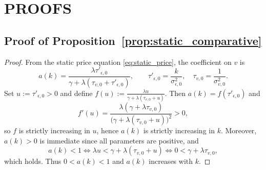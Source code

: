 \section{PROOFS}
\label{sec:proofs}

\subsection*{Proof of Proposition~\ref{prop:static_comparative}}
\begin{proof}
From the static price equation \eqref{eq:static_price}, the coefficient on $v$ is
\[
a(k)=\frac{\lambda \tau'_{\epsilon,0}}{\gamma+\lambda(\tau_{v,0}+\tau'_{\epsilon,0})},
\qquad \tau'_{\epsilon,0}=\frac{k}{\sigma_{\epsilon,0}^2},\quad \tau_{v,0}=\frac{1}{\sigma_{v,0}^2}.
\]
Set $u:=\tau'_{\epsilon,0}>0$ and define $f(u):=\frac{\lambda u}{\gamma+\lambda(\tau_{v,0}+u)}$.
Then $a(k)=f(\tau'_{\epsilon,0})$ and
\[
f'(u)=\frac{\lambda(\gamma+\lambda\tau_{v,0})}{\big(\gamma+\lambda(\tau_{v,0}+u)\big)^2}>0,
\]
so $f$ is strictly increasing in $u$, hence $a(k)$ is strictly increasing in $k$.
Moreover, $a(k)>0$ is immediate since all parameters are positive, and
\[
a(k)<1 \iff \lambda u < \gamma+\lambda(\tau_{v,0}+u) \iff 0<\gamma+\lambda\tau_{v,0},
\]
which holds. Thus $0<a(k)<1$ and $a(k)$ increases with $k$.
\end{proof}

